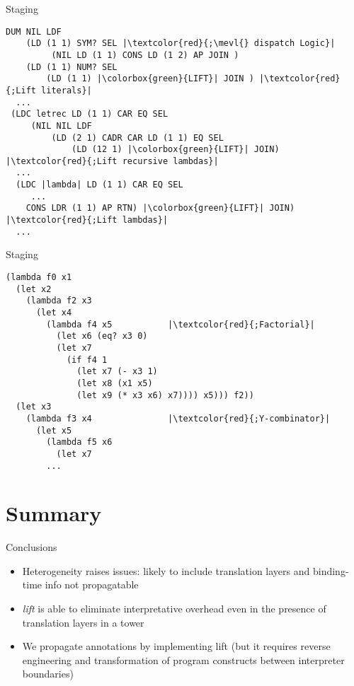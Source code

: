 \documentclass{beamer}
\begin{document}
\begin{frame}[fragile]{Staging \texorpdfstring{\mevl}{}}
         \begin{verbatim}
DUM NIL LDF
    (LD (1 1) SYM? SEL |\textcolor{red}{;\mevl{} dispatch Logic}|
         (NIL LD (1 1) CONS LD (1 2) AP JOIN )
    (LD (1 1) NUM? SEL
        (LD (1 1) |\colorbox{green}{LIFT}| JOIN ) |\textcolor{red}{;Lift literals}|
  ...
 (LDC letrec LD (1 1) CAR EQ SEL
     (NIL NIL LDF
         (LD (2 1) CADR CAR LD (1 1) EQ SEL
             (LD (12 1) |\colorbox{green}{LIFT}| JOIN) |\textcolor{red}{;Lift recursive lambdas}|
  ...
  (LDC |lambda| LD (1 1) CAR EQ SEL
     ...
    CONS LDR (1 1) AP RTN) |\colorbox{green}{LIFT}| JOIN) |\textcolor{red}{;Lift lambdas}|
  ...
         \end{verbatim}
\end{frame}

\begin{frame}[fragile]{Staging \texorpdfstring{\mevl}{}}
     \begin{verbatim}
(lambda f0 x1
  (let x2
    (lambda f2 x3
      (let x4
        (lambda f4 x5           |\textcolor{red}{;Factorial}|
          (let x6 (eq? x3 0)
          (let x7
            (if f4 1
              (let x7 (- x3 1)
              (let x8 (x1 x5)
              (let x9 (* x3 x6) x7)))) x5))) f2))
  (let x3
    (lambda f3 x4               |\textcolor{red}{;Y-combinator}|
      (let x5
        (lambda f5 x6
          (let x7
        ...
         \end{verbatim}
\end{frame}


\section{Summary}
\begin{frame}{Conclusions}
    \begin{itemize}
        \item Heterogeneity raises issues: likely to include translation layers and binding-time info not propagatable
        \item \textit{lift} is able to eliminate interpretative overhead even in the presence of translation layers in a tower
        \item We propagate annotations by implementing lift (but it requires reverse engineering and transformation of program constructs between interpreter boundaries)
    \end{itemize}
\end{frame}
\end{document}

